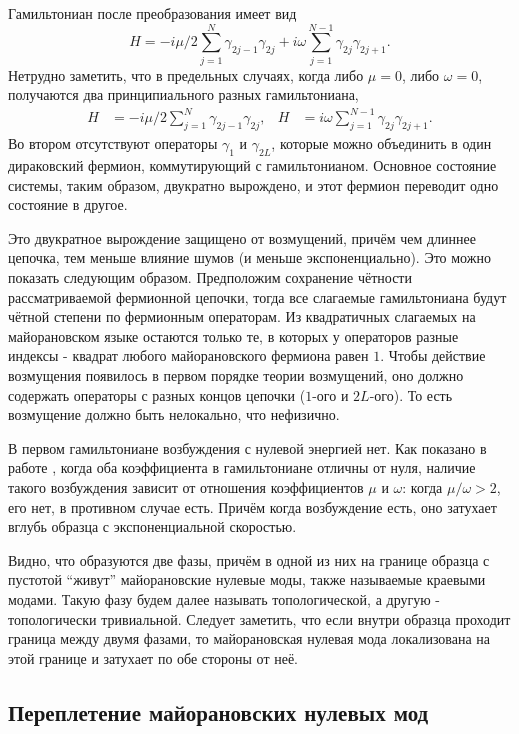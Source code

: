 \documentclass[a4paper,12pt]{article}
\theoremstyle{plain} %
\theoremstyle{definition} %
\theoremstyle{remark} %
\begin{document}
Гамильтониан после преобразования имеет вид
\begin{equation}
H = -i\mu/2 \sum\limits_{j=1}^N \gamma_{2j-1} \gamma_{2j} + i \omega \sum\limits_{j=1}^{N-1} \gamma_{2j} \gamma_{2j+1}.
\label{eq:main_hamiltonian}
\end{equation}
Нетрудно заметить, что в предельных случаях, когда либо $\mu = 0$, либо $\omega = 0$, получаются два принципиального разных гамильтониана,
\begin{align}
H &= -i\mu/2 \sum\limits_{j=1}^N \gamma_{2j-1} \gamma_{2j}, & H &= i \omega \sum\limits_{j=1}^{N-1} \gamma_{2j} \gamma_{2j+1}.
\end{align}
Во втором отсутствуют операторы $\gamma_1$ и $\gamma_{2L}$, которые можно объединить в один дираковский фермион, коммутирующий с гамильтонианом. Основное состояние системы, таким образом, двукратно вырождено, и этот фермион переводит одно состояние в другое.

Это двукратное вырождение защищено от возмущений, причём чем длиннее цепочка, тем меньше влияние шумов (и меньше экспоненциально). Это можно показать следующим образом. Предположим сохранение чётности рассматриваемой фермионной цепочки, тогда все слагаемые гамильтониана будут чётной степени по фермионным операторам. Из квадратичных слагаемых на майорановском языке остаются только те, в которых у операторов разные индексы - квадрат любого майорановского фермиона равен $1$. Чтобы действие возмущения появилось в первом порядке теории возмущений, оно должно содержать операторы с разных концов цепочки ($1$-ого и $2L$-ого). То есть возмущение должно быть нелокально, что нефизично. 

В первом гамильтониане возбуждения с нулевой энергией нет. Как показано в работе \cite{kitaev}, когда оба коэффициента в гамильтониане отличны от нуля, наличие такого возбуждения зависит от отношения коэффициентов $\mu$ и $\omega$: когда $\mu/\omega > 2$, его нет, в противном случае есть. Причём когда возбуждение есть, оно затухает вглубь образца с экспоненциальной скоростью.

Видно, что образуются две фазы, причём в одной из них на границе образца с пустотой ``живут'' майорановские нулевые моды, также называемые краевыми модами. Такую фазу будем далее называть топологической, а другую - топологически тривиальной. Следует заметить, что если внутри образца проходит граница между двумя фазами, то майорановская нулевая мода локализована на этой границе и затухает по обе стороны от неё.


\subsection{Переплетение майорановских нулевых мод}
\end{document}
